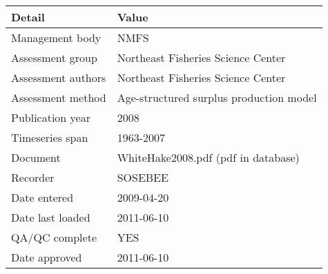 \begin{table}[htb]
\centering
\begin{tabular}{lp{7cm}}
\toprule
Detail & Value \\
\midrule
Management body    & NMFS                                    \\
Assessment group   & Northeast Fisheries Science Center      \\
Assessment authors & Northeast Fisheries Science Center      \\
Assessment method  & Age-structured surplus production model \\
Publication year   & 2008                                    \\
Timeseries span    & 1963-2007                               \\
Document           & WhiteHake2008.pdf (pdf in database)     \\
Recorder           & SOSEBEE                                 \\
Date entered       & 2009-04-20                              \\
Date last loaded   & 2011-06-10                              \\
QA/QC complete     & YES                                     \\
Date approved      & 2011-06-10                              \\
\bottomrule
\end{tabular}
\label{tab:assessdet}
\end{table}

